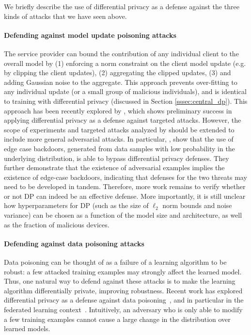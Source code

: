 \documentclass[11pt]{article}
\begin{document}
We briefly describe the use of differential privacy as a defense against the three kinds of attacks that we have seen above.

\paragraph{Defending against model update poisoning attacks}
The service provider can bound the contribution of any individual client to the overall model by (1) enforcing a norm constraint on the client model update (e.g. by clipping the client updates), (2) aggregating the clipped updates, (3) and adding Gaussian noise to the aggregate. This approach prevents over-fitting to any individual update (or a small group of malicious individuals), and is identical to training with differential privacy (discussed in Section \ref{sssec:central_dp}). This approach has been recently explored by \citet{sun2019backdoor}, which shows preliminary success in applying differential privacy as a defense against targeted attacks. However, the scope of experiments and targeted attacks analyzed by \citet{sun2019backdoor} should be extended to include more general adversarial attacks. In particular, \citet{wang2020attack}, show that the use of edge case backdoors, generated from data samples with low probability in the underlying distribution, is able to bypass differential privacy defenses. They further demonstrate that the existence of adversarial examples implies the existence of edge-case backdoors, indicating that defenses for the two threats may need to be developed in tandem.  Therefore, more work remains to verify whether or not DP can indeed be an effective defense. More importantly, it is still unclear how hyperparameters for DP (such as the size of $\ell_2$ norm bounds and noise variance) can be chosen as a function of the model size and architecture, as well as the fraction of malicious devices.

\paragraph{Defending against data poisoning attacks}

Data poisoning can be thought of as a failure of a learning algorithm to be robust: a few attacked training examples may strongly affect the learned model. Thus, one natural way to defend against these attacks is to make the learning algorithm differentially private, improving robustness. Recent work has explored differential privacy as a defense against data poisoning~\citep{MZH19}, and in particular in the federated learning context~\citep{geyer2017differentiallyyer}. Intuitively, an adversary who is only able to modify a few training examples cannot cause a large change in the distribution over learned models.
\end{document}
